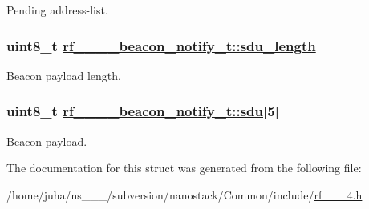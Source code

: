 Pending address-list. \hypertarget{structrf__802__15__4__beacon__notify__t_615ecd7915386d4733ba13aa31d6a333}{
\subsubsection[sdu\_\-length]{\setlength{\rightskip}{0pt plus 5cm}uint8\_\-t \hyperlink{structrf__802__15__4__beacon__notify__t_615ecd7915386d4733ba13aa31d6a333}{rf\_\_\_\_\-beacon\_\-notify\_\-t::sdu\_\-length}}}
\label{structrf__802__15__4__beacon__notify__t_615ecd7915386d4733ba13aa31d6a333}


Beacon payload length. \hypertarget{structrf__802__15__4__beacon__notify__t_5af4eff5ea62bc06bda82fc144abf6ed}{
\subsubsection[sdu]{\setlength{\rightskip}{0pt plus 5cm}uint8\_\-t \hyperlink{structrf__802__15__4__beacon__notify__t_5af4eff5ea62bc06bda82fc144abf6ed}{rf\_\_\_\_\-beacon\_\-notify\_\-t::sdu}\mbox{[}5\mbox{]}}}
\label{structrf__802__15__4__beacon__notify__t_5af4eff5ea62bc06bda82fc144abf6ed}


Beacon payload. 

The documentation for this struct was generated from the following file:\begin{CompactItemize}
\item 
/home/juha/ns\_\_\_/subversion/nanostack/Common/include/\hyperlink{rf__802__15__4_8h}{rf\_\_\_\-4.h}\end{CompactItemize}
